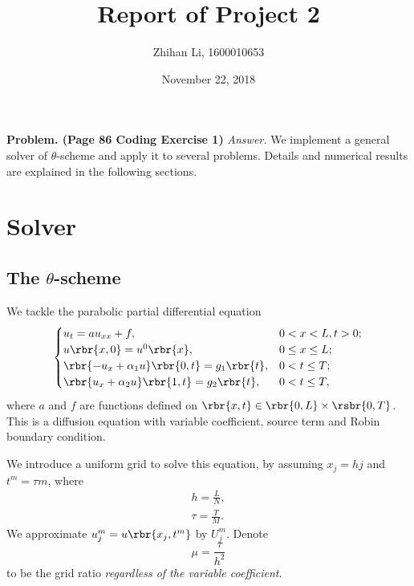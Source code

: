 \documentclass[english, nochinese]{pnote}
\title{Report of Project 2}
\author{Zhihan Li, 1600010653}
\date{November 22, 2018}
\begin{document}
\maketitle

\textbf{Problem. (Page 86 Coding Exercise 1)} \textit{Answer.} We implement a general solver of $\theta$-scheme and apply it to several problems. Details and numerical results are explained in the following sections.

\section{Solver}

\subsection{The $\theta$-scheme}

We tackle the parabolic partial differential equation
\begin{equation}
\begin{cases}
u_t = a u_{ x x } + f, & 0 < x < L, t > 0; \\
u \rbr{ x, 0 } = u^0 \rbr{x}, & 0 \le x \le L; \\
\rbr{ -u_x + \alpha_1 u } \rbr{ 0, t } = g_1 \rbr{t}, & 0 < t \le T; \\
\rbr{ u_x + \alpha_2 u } \rbr{ 1, t } = g_2 \rbr{t}, & 0 < t \le T,
\end{cases}
\end{equation}
where $a$ and $f$ are functions defined on $ \rbr{ x, t } \in \rbr{ 0, L } \times \rsbr{ 0, T } $. This is a diffusion equation with variable coefficient, source term and Robin boundary condition.

We introduce a uniform grid to solve this equation, by assuming $ x_j = h j $ and $ t^m = \tau m $, where
\begin{gather}
h = \frac{L}{N}, \\
\tau = \frac{T}{M}.
\end{gather}
We approximate $ u_j^m = u \rbr{ x_j, t^m } $ by $U_j^m$. Denote
\begin{equation}
\mu = \frac{\tau}{h^2}
\end{equation}
to be the grid ratio \emph{regardless of the variable coefficient}.
\end{document}
